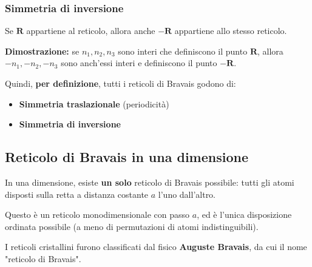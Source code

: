 \subsubsection{Simmetria di inversione}
Se $\mathbf{R}$ appartiene al reticolo, allora anche $-\mathbf{R}$ appartiene allo stesso reticolo.

\textbf{Dimostrazione:} se $n_1, n_2, n_3$ sono interi che definiscono il punto $\mathbf{R}$, allora $-n_1, -n_2, -n_3$ sono anch'essi interi e definiscono il punto $-\mathbf{R}$.

Quindi, \textbf{per definizione}, tutti i reticoli di Bravais godono di:
\begin{itemize}
    \item \textbf{Simmetria traslazionale} (periodicità)
    \item \textbf{Simmetria di inversione}
\end{itemize}

\subsection*{Reticolo di Bravais in una dimensione}

In una dimensione, esiste \textbf{un solo} reticolo di Bravais possibile: tutti gli atomi disposti sulla retta a distanza costante $a$ l'uno dall'altro.

\vspace{0.5cm}
\begin{center}
\end{center}
\vspace{0.5cm}

Questo è un reticolo monodimensionale con passo $a$, ed è l'unica disposizione ordinata possibile (a meno di permutazioni di atomi indistinguibili).

I reticoli cristallini furono classificati dal fisico \textbf{Auguste Bravais}, da cui il nome "reticolo di Bravais".

